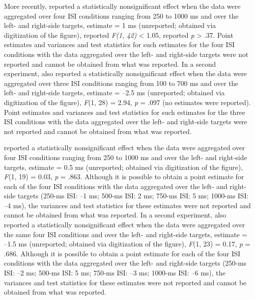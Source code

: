 \documentclass[man,floatsintext]{apa6}
\theoremstyle{definition}
\theoremstyle{definition}
\theoremstyle{definition}
\theoremstyle{remark}
\begin{document}
More recently, \textcite{vanDijck2014} reported a statistically
nonsignificant effect when the data were aggregated over four ISI
conditions ranging from 250 to 1000 ms and over the left- and right-side
targets, estimate = 1 ms (unreported; obtained via digitization of the
figure), reported \emph{F(1, 42)} \textless{} 1.05, reported \emph{p}
\textgreater{} .37. Point estimates and variances and test statistics
for such estimates for the four ISI conditions with the data aggregated
over the left- and right-side targets were not reported and cannot be
obtained from what was reported. In a second experiment,
\textcite{vanDijck2014} also reported a statistically nonsignificant
effect when the data were aggregated over three ISI conditions ranging
from 100 to 700 ms and over the left- and right-side targets, estimate =
--2.5 ms (unreported; obtained via digitization of the figure),
\emph{F}(1, 28) = 2.94, \emph{p} = .097 (no estimates were reported).
Point estimates and variances and test statistics for such estimates for
the three ISI conditions with the data aggregated over the left- and
right-side targets were not reported and cannot be obtained from what
was reported.

\textcite{Zanolie:2014jr} reported a statistically nonsignificant effect
when the data were aggregated over four ISI conditions ranging from 250
to 1000 ms and over the left- and right-side targets, estimate = 0.5 ms
(unreported; obtained via digitization of the figure), \emph{F}(1, 19) =
0.03, \emph{p} = .863. Although it is possible to obtain a point
estimate for each of the four ISI conditions with the data aggregated
over the left- and right-side targets (250-ms ISI: --1 ms; 500-ms ISI: 2
ms; 750-ms ISI: 5 ms; 1000-ms ISI: --4 ms), the variances and test
statistics for these estimates were not reported and cannot be obtained
from what was reported. In a second experiment,
\textcite{Zanolie:2014jr} also reported a statistically nonsignificant
effect when the data were aggregated over the same four ISI conditions
and over the left- and right-side targets, estimate = --1.5 ms
(unreported; obtained via digitization of the figure), \emph{F}(1, 23) =
0.17, \emph{p} = .686. Although it is possible to obtain a point
estimate for each of the four ISI conditions with the data aggregated
over the left- and right-side targets (250-ms ISI: --2 ms; 500-ms ISI: 5
ms; 750-ms ISI: --3 ms; 1000-ms ISI: --6 ms), the variances and test
statistics for these estimates were not reported and cannot be obtained
from what was reported.
\end{document}
